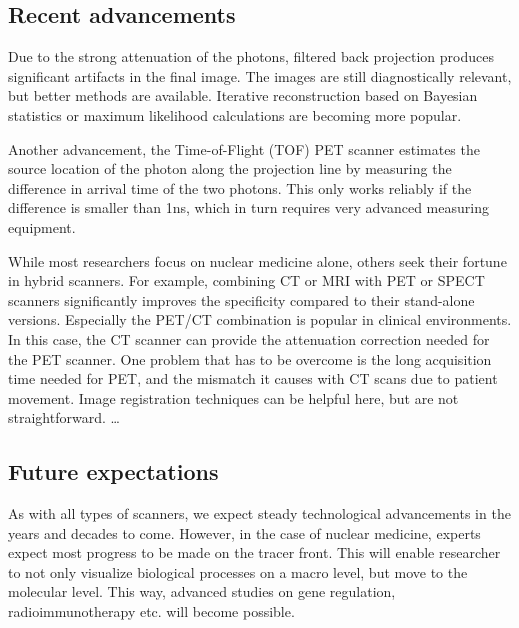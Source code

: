 \subsection{Recent advancements}
Due to the strong attenuation of the photons, filtered back projection produces
significant artifacts in the final image. The images are still diagnostically
relevant, but better methods are available. Iterative reconstruction based on
Bayesian statistics or maximum likelihood calculations are becoming more
popular.

Another advancement, the Time-of-Flight (TOF) PET scanner estimates the
source location of the photon along the projection line by measuring the
difference in arrival time of the two photons. This only works reliably if the
difference is smaller than 1ns, which in turn requires very advanced measuring
equipment.

While most researchers focus on nuclear medicine alone, others seek their
fortune in hybrid scanners. For example, combining CT or MRI with PET or SPECT
scanners significantly improves the specificity compared to their stand-alone
versions. Especially the PET/CT combination is popular in clinical environments.
In this case, the CT scanner can provide the attenuation correction needed for
the PET scanner. One problem that has to be overcome is the long acquisition
time needed for PET, and the mismatch it causes with CT scans due to patient
movement. Image registration techniques can be helpful here, but are not
straightforward.
\ldots

\subsection{Future expectations}
As with all types of scanners, we expect steady technological advancements in
the years and decades to come. However, in the case of nuclear medicine, experts
expect most progress to be made on the tracer front. This will enable researcher
to not only visualize biological processes on a macro level, but move to the
molecular level. This way, advanced studies on gene regulation,
radioimmunotherapy etc. will become possible.


